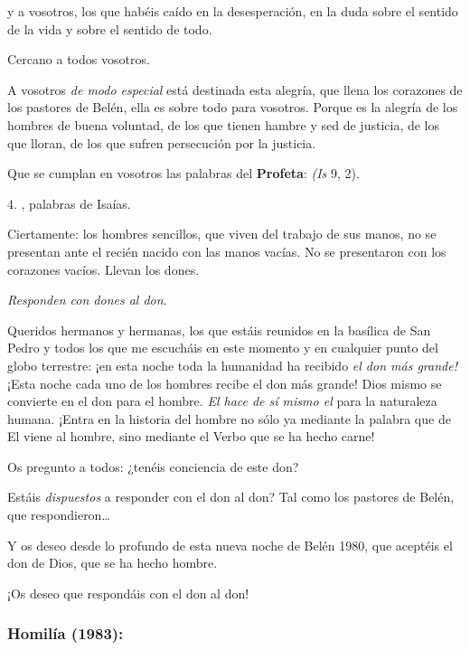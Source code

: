 \begin{body}
	y a vosotros, los que habéis caído en la desesperación, en la duda sobre el sentido de la vida y sobre el sentido de todo.
	
	Cercano a todos vosotros.
	
	A vosotros \emph{de modo especial} está destinada esta alegría, que llena los corazones de los pastores de Belén, ella es sobre todo para vosotros. Porque es la alegría de los hombres de buena voluntad, de los que tienen hambre y sed de justicia, de los que lloran, de los que sufren persecución por la justicia.
	
	Que se cumplan en vosotros las palabras del \textbf{Profeta}:  \emph{(Is} 9, 2).
	
	4. , palabras de Isaías.
	
	Ciertamente: los hombres sencillos, que viven del trabajo de sus manos, no se presentan ante el recién nacido con las manos vacías. No se presentaron con los corazones vacíos. Llevan los dones.
	
	\emph{Responden con dones al don}.
	
	Queridos hermanos y hermanas, los que estáis reunidos en la basílica de San Pedro y todos los que me escucháis en este momento y en cualquier punto del globo terrestre: ¡en esta noche toda la humanidad ha recibido \emph{el don más grande!} ¡Esta noche cada uno de los hombres recibe el don más grande! Dios mismo se convierte en el don para el hombre. \emph{El hace de sí mismo el } para la naturaleza humana. ¡Entra en la historia del hombre no sólo ya mediante la palabra que de El viene al hombre, sino mediante el Verbo que se ha hecho carne!
	
	Os pregunto a todos: ¿tenéis conciencia de este don?
	
	Estáis \emph{dispuestos} a responder con el don al don? Tal como los pastores de Belén, que respondieron\ldots{}
	
	Y os deseo desde lo profundo de esta nueva noche de Belén 1980, que aceptéis el don de Dios, que se ha hecho hombre.
	
	¡Os deseo que respondáis con el don al don!
\end{body}

\subsubsection{Homilía (1983):}

